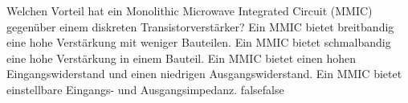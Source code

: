     {Welchen Vorteil hat ein Monolithic Microwave Integrated Circuit (MMIC) gegenüber einem diskreten Transistorverstärker?}
    {Ein MMIC bietet breitbandig eine hohe Verstärkung mit weniger Bauteilen.}
    {Ein MMIC bietet schmalbandig eine hohe Verstärkung in einem Bauteil.}
    {Ein MMIC bietet einen hohen Eingangswiderstand und einen niedrigen Ausgangswiderstand.}
    {Ein MMIC bietet einstellbare Eingangs- und Ausgangsimpedanz.}
    {false}{false}